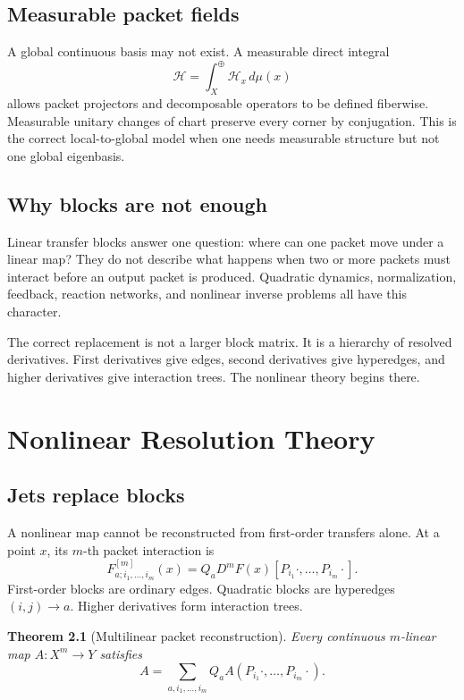 \documentclass[11pt,oneside]{book}
\newtheorem{theorem}[definition]{Theorem}
\theoremstyle{remark}
\begin{document}
\section{Measurable packet fields}
A global continuous basis may not exist.  A measurable direct integral
\[
\mathcal H=\int_X^\oplus\mathcal H_x\,d\mu(x)
\]
allows packet projectors and decomposable operators to be defined fiberwise.  Measurable unitary changes of chart preserve every corner by conjugation.  This is the correct local-to-global model when one needs measurable structure but not one global eigenbasis.

\section*{Why blocks are not enough}
Linear transfer blocks answer one question: where can one packet move under a linear map?  They do not describe what happens when two or more packets must interact before an output packet is produced.  Quadratic dynamics, normalization, feedback, reaction networks, and nonlinear inverse problems all have this character.

The correct replacement is not a larger block matrix.  It is a hierarchy of resolved derivatives.  First derivatives give edges, second derivatives give hyperedges, and higher derivatives give interaction trees.  The nonlinear theory begins there.

\chapter{Nonlinear Resolution Theory}

\section{Jets replace blocks}
A nonlinear map cannot be reconstructed from first-order transfers alone.  At a point \(x\), its \(m\)-th packet interaction is
\[
F^{[m]}_{a;i_1,\ldots,i_m}(x)
=Q_aD^mF(x)[P_{i_1}\cdot,\ldots,P_{i_m}\cdot].
\]
First-order blocks are ordinary edges.  Quadratic blocks are hyperedges \((i,j)\to a\).  Higher derivatives form interaction trees.

\begin{theorem}[Multilinear packet reconstruction]
Every continuous \(m\)-linear map \(A:X^m\to Y\) satisfies
\[
A
=\sum_{a,i_1,\ldots,i_m}
Q_aA(P_{i_1}\cdot,\ldots,P_{i_m}\cdot).
\]
\end{theorem}
\end{document}
